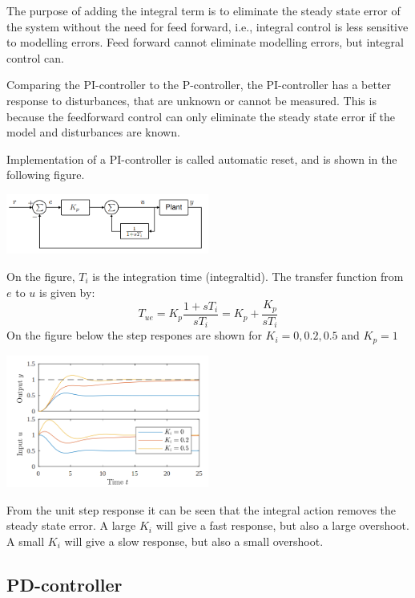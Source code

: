The purpose of adding the integral term is to
eliminate the steady state error of the system without the need for
feed forward, i.e., integral control is less sensitive to modelling errors.
Feed forward cannot eliminate modelling errors, but integral control can.

Comparing the PI-controller to the P-controller, the PI-controller has
a better response to disturbances, that are unknown or cannot be measured.
This is because the feedforward control can only eliminate the steady state error
if the model and disturbances are known.



Implementation of a PI-controller is called automatic reset, and is
shown in the following figure.


\begin{center}
	\includegraphics[width = 0.5\textwidth]{Images/PI-implementation.png}
\end{center}

On the figure, $T_i$ is the integration time (integraltid). The
transfer function from $e$ to $u$ is given by:
$$ T_{ue} = K_p \frac{1 + sT_i}{sT_i} = K_p + \frac{K_p}{sT_i} $$
\newpage
On the figure below the step respones are shown for $K_i = 0,0.2,0.5$ and $K_p = 1$
\begin{center}
	\includegraphics[width = 0.5\textwidth]{Images/PI-unitStep.png}
\end{center}
From the unit step response it can be seen that the integral action removes
the steady state error. A large $K_i$ will give a fast response, but also
a large overshoot. A small $K_i$ will give a slow response, but also a small
overshoot.


\subsection{PD-controller}

